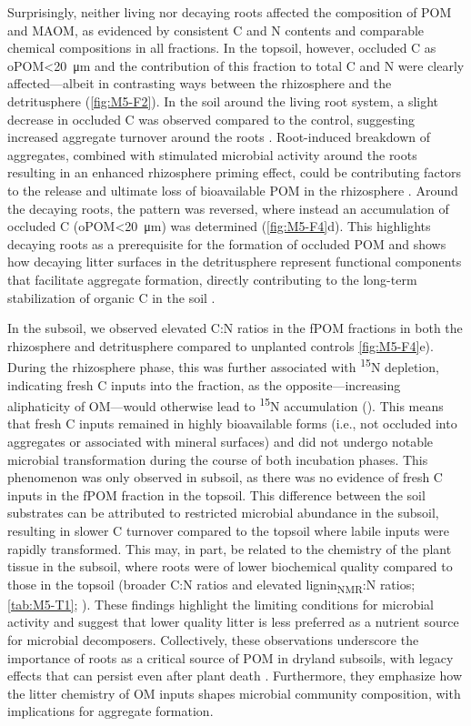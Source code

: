 Surprisingly, neither living nor decaying roots affected the composition of POM and MAOM, as evidenced by consistent C and N contents and comparable chemical compositions in all fractions. In the topsoil, however, occluded C as oPOM<\SI{20}{\micro\metre} and the contribution of this fraction to total C and N were clearly affected---albeit in contrasting ways between the rhizosphere and the detritusphere (\ref{fig:M5-F2}). In the soil around the living root system, a slight decrease in occluded C was observed compared to the control, suggesting increased aggregate turnover around the roots \citep{Wang2020}. Root-induced breakdown of aggregates, combined with stimulated microbial activity around the roots resulting in an enhanced rhizosphere priming effect, could be contributing factors to the release and ultimate loss of bioavailable POM in the rhizosphere \citep{Cheng2009}. Around the decaying roots, the pattern was reversed, where instead an accumulation of occluded C (oPOM<\SI{20}{\micro\metre}) was determined (\ref{fig:M5-F4}d). This highlights decaying roots as a prerequisite for the formation of occluded POM and shows how decaying litter surfaces in the detritusphere represent functional components that facilitate aggregate formation, directly contributing to the long-term stabilization of organic C in the soil \citep{Witzgall2021}.

In the subsoil, we observed elevated C:N ratios in the fPOM fractions in both the rhizosphere and detritusphere compared to unplanted controls \ref{fig:M5-F4}e). During the rhizosphere phase, this was further associated with \textsuperscript{15}N depletion, indicating fresh C inputs into the fraction, as the opposite---increasing aliphaticity of OM---would otherwise lead to \textsuperscript{15}N accumulation (\citep{Kramer2003}). This means that fresh C inputs remained in highly bioavailable forms (i.e., not occluded into aggregates or associated with mineral surfaces) and did not undergo notable microbial transformation during the course of both incubation phases. This phenomenon was only observed in subsoil, as there was no evidence of fresh C inputs in the fPOM fraction in the topsoil. This difference between the soil substrates can be attributed to restricted microbial abundance in the subsoil, resulting in slower C turnover compared to the topsoil where labile inputs were rapidly transformed. This may, in part, be related to the chemistry of the plant tissue in the subsoil, where roots were of lower biochemical quality compared to those in the topsoil (broader C:N ratios and elevated lignin\textsubscript{NMR}:N ratios; \ref{tab:M5-T1}; \citep{Walela2014}). These findings highlight the limiting conditions for microbial activity and suggest that lower quality litter is less preferred as a nutrient source for microbial decomposers. Collectively, these observations underscore the importance of roots as a critical source of POM in dryland subsoils, with legacy effects that can persist even after plant death \citep{Angst2016}. Furthermore, they emphasize how the litter chemistry of OM inputs shapes microbial community composition, with implications for aggregate formation.


